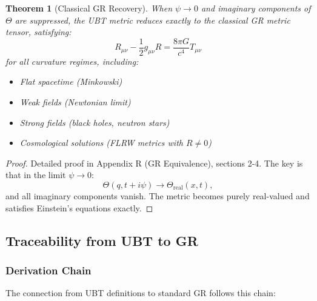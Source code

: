 \documentclass[12pt]{article}
\newtheorem{theorem}{Theorem}[section]
\theoremstyle{definition}
\theoremstyle{remark}
\begin{document}
\begin{theorem}[Classical GR Recovery]
When $\psi \to 0$ and imaginary components of $\Theta$ are suppressed, the UBT metric reduces exactly to the classical GR metric tensor, satisfying:
\begin{equation}
R_{\mu\nu} - \frac{1}{2}g_{\mu\nu}R = \frac{8\pi G}{c^4}T_{\mu\nu}
\end{equation}
for all curvature regimes, including:
\begin{itemize}
    \item Flat spacetime (Minkowski)
    \item Weak fields (Newtonian limit)
    \item Strong fields (black holes, neutron stars)
    \item Cosmological solutions (FLRW metrics with $R \neq 0$)
\end{itemize}
\end{theorem}

\begin{proof}
Detailed proof in Appendix R (GR Equivalence), sections 2-4. The key is that in the limit $\psi \to 0$:
\begin{equation}
\Theta(q,t+i\psi) \to \Theta_{\text{real}}(x,t),
\end{equation}
and all imaginary components vanish. The metric becomes purely real-valued and satisfies Einstein's equations exactly.
\end{proof}

\subsection{Traceability from UBT to GR}

\subsubsection{Derivation Chain}

The connection from UBT definitions to standard GR follows this chain:
\end{document}
